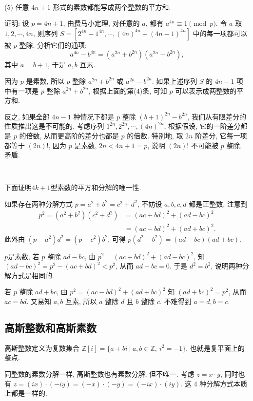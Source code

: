 ~

\noindent (5) 任意 $ 4n + 1 $ 形式的素数都能写成两个整数的平方和.

证明: 设 $ p = 4n + 1 $, 由费马小定理, 对任意的 $ a $, 都有 $ a^{4n} \equiv 1 \pmod{p} $. 令 $ a $ 取 $ 1, 2, \cdots, 4n $, 则序列 $ S = \left[2^{4n}-1^{4n}, \cdots, (4n)^{4n}-(4n-1)^{4n} \right] $ 中的每一项都可以被 $ p $ 整除. 分析它们的通项: \[ a^{4n}-b^{4n}=(a^{2n}+b^{2n})(a^{2n}-b^{2n}),\] 
其中 $ a=b+1 $, 于是 $a,b$ 互素.

因为 $p$ 是素数, 所以 $p$ 整除 $ a^{2n}+b^{2n} $ 或 $ a^{2n}-b^{2n} $. 如果上述序列 $ S $ 的 $ 4n-1 $ 项中有一项是 $p$ 整除 $ a^{2n}+b^{2n} $, 根据上面的第(4)条, 可知 $p$ 可以表示成两整数的平方和. 

反之, 如果全部 $ 4n-1 $ 种情况下都是 $p$ 整除 $ (b+1)^{2n}-b^{2n} $, 我们从有限差分的性质推出这是不可能的.
考虑序列 $ 1^{2n}, 2^{2n}, \cdots, (4n)^{2n} $, 根据假设, 它的一阶差分都是 $p$ 的倍数, 从而更高阶的差分也都是 $ p $ 的倍数. 特别地, 取 $ 2n $ 阶差分, 它每一项都等于 $ (2n)! $, 因为 $ p $ 是素数, $ 2n < 4n + 1 = p $, 说明 $(2n)!$ 不可能被 $p$ 整除, 矛盾.

~

下面证明$4k+1$型素数的平方和分解的唯一性.

如果存在两种分解方式 $ p = a^2+b^2=c^2+d^2 $, 不妨设 $a,b,c,d $ 都是正整数, 注意到
\begin{align*} 
p^2=(a^2+b^2)(c^2+d^2) & =(ac+bd)^2+(ad-bc)^2 \\ & =(ac-bd)^2+(ad+bc)^2 .\end{align*}
此外由 $ (p-a^2)d^2=(p-c^2)b^2 $, 可得 $ p(d^2-b^2)=(ad-bc)(ad+bc) $.

$ p $是素数, 若 $p$ 整除 $ ad-bc$, 由 $p^2=(ac+bd)^2+(ad-bc)^2$, 知 $ (ad-bc)^2 = p^2-(ac+bd)^2 < p^2 $, 从而 $ ad-bc=0 $. 于是 $ d^2=b^2 $, 说明两种分解方式是相同的.

若 $p$ 整除 $ad+bc$, 由 $p^2=(ac-bd)^2+(ad+bc)^2$ 知 $ (ad+bc)^2 = p^2 $, 从而 $ ac = bd $. 又易知 $a,b$ 互素, 所以 $ a $ 整除 $ d $ 且 $ b $ 整除 $ c $. 不难得到 $ a=d, b=c $.


\subsection{高斯整数和高斯素数}

高斯整数定义为复数集合 $ \mathbb{Z}\left[i\right] = \{ a + bi\ |\ a,b\in\mathbb{Z},\ i^2=-1\} $, 也就是复平面上的整点. 

同整数的素数分解一样, 高斯整数也有素数分解, 但不唯一. 考虑 $ z = x\cdot y $, 同时也有 $ z = (ix)\cdot(-iy) = (-x)\cdot(-y) = (-ix)\cdot(iy) $. 这 4 种分解方式本质上都是一样的.

